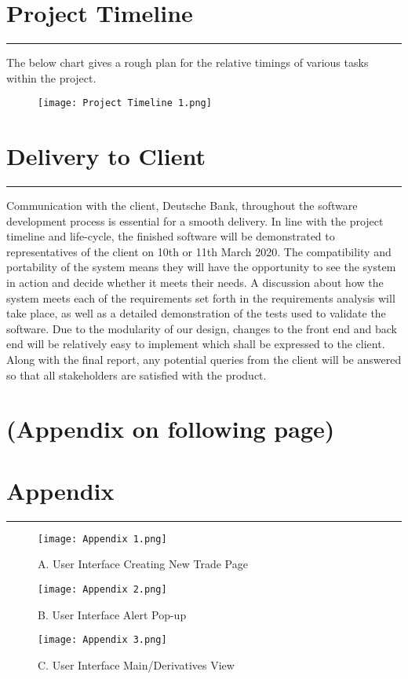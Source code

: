 \documentclass{article}
\begin{document}
\newpage
\section*{Project Timeline}
\hrule
\vspace{9pt}
The below chart gives a rough plan for the relative timings of various tasks within the project.

\begin{figure}[h]
    \centering
    \texttt{[image: Project Timeline 1.png]}
\end{figure}
\section*{Delivery to Client}
\hrule
\vspace{9pt}
Communication with the client, Deutsche Bank, throughout the software development process is essential for a smooth delivery. In line with the project timeline and life-cycle, the finished software will be demonstrated to representatives of the client on 10th or 11th March 2020. The compatibility and portability of the system means they will have the opportunity to see the system in action and decide whether it meets their needs. A discussion about how the system meets each of the requirements set forth in the requirements analysis will take place, as well as a detailed demonstration of the tests used to validate the software. Due to the modularity of our design, changes to the front end and back end will be relatively easy to implement which shall be expressed to the client. Along with the final report, any potential queries from the client will be answered so that all stakeholders are satisfied with the product.
\vfill
\section*{(Appendix on following page)}
\newpage
\section*{Appendix}
\hrule
\vspace{9pt}
\begin{figure}[H]
    \centering
    \texttt{[image: Appendix 1.png]}
    \caption*{A. User Interface Creating New Trade Page}
    \texttt{[image: Appendix 2.png]}
    \caption*{B. User Interface Alert Pop-up}
    \texttt{[image: Appendix 3.png]}
    \caption*{C. User Interface Main/Derivatives View}
\end{figure}
\end{document}
